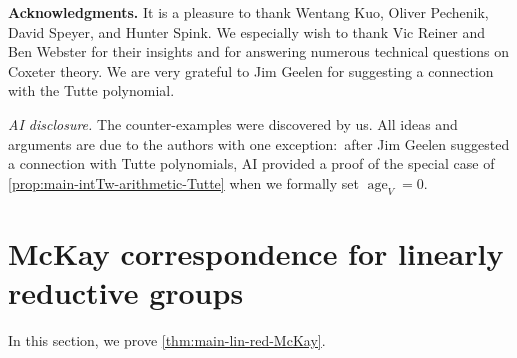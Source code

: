 \documentclass[12pt,a4paper]{amsart}
\theoremstyle{definition}
\renewcommand{\1}{\textbf{1}}
\newcommand{\<}{\langle}
\renewcommand{\>}{\rangle}
\DeclareMathOperator{\age}{age}
\begin{document}
\vspace{1em}


\noindent\textbf{Acknowledgments.} It is a pleasure to thank Wentang Kuo, Oliver Pechenik, David Speyer, and Hunter Spink. We especially wish to thank Vic Reiner and Ben Webster for their insights and for answering numerous technical questions on Coxeter theory. We are very grateful to Jim Geelen for suggesting a connection with the Tutte polynomial.

\vspace{1em}

\noindent\emph{AI disclosure.} The counter-examples were discovered by us. All ideas and arguments are due to the authors with one exception:~after Jim Geelen suggested a connection with Tutte polynomials, AI provided a proof of the special case of \autoref{prop:main-intTw-arithmetic-Tutte} when we formally set $\age_V=0$.














\section{McKay correspondence for linearly reductive groups}


In this section, we prove \autoref{thm:main-lin-red-McKay}. 
\end{document}
